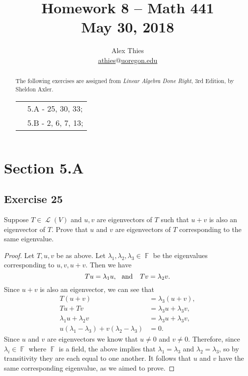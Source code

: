 \documentclass[letterpaper, 12pt]{amsart}
\DeclareMathOperator{\F}{\mathbb{F}}				%
\DeclareMathOperator{\Ell}{\mathscr{L}}				%
\theoremstyle{definition}  							%
\begin{document}
	\title{Homework 8  -- Math 441 \\ M\lowercase{ay 30, 2018}}
	\author{Alex Thies \\ \href{mailto:athies@uoregon.edu}{\lowercase{athies$@$uoregon.edu}}}

	\begin{abstract}
	The following exercises are assigned from \textit{Linear Algebra Done Right}, 3rd Edition, by Sheldon Axler. 
			\begin{tabular}{rl}
				& 5.A - 25, 30, 33; \\
				& 5.B - 2, 6, 7, 13;
			\end{tabular}
	\end{abstract}
	
	\maketitle

	\section*{Section 5.A}
		\subsection*{Exercise 25}
		Suppose $T \in \Ell(V)$ and $u,v$ are eigenvectors of $T$ such that $u + v$ is also an eigenvector of $T$. 
		Prove that $u$ and $v$ are eigenvectors of $T$ corresponding to the same eigenvalue.

		\begin{proof}
		Let $T,u,v$ be as above.
		Let $\lambda_{1},\lambda_{2},\lambda_{3} \in \F$ be the eigenvalues corresponding to $u,v,u+v$.
		Then we have $$Tu = \lambda_{1}u, \hspace{2.5mm} \text{and } \hspace{2.5mm} Tv = \lambda_{2}v.$$
		Since $u+v$ is also an eigenvector, we can see that
			\begin{align*}
				T(u+v) &= \lambda_{3}(u + v), \\
				Tu + Tv &= \lambda_{3}u + \lambda_{3}v, \\
				\lambda_{1}u + \lambda_{2}v &= \lambda_{3}u + \lambda_{3}v, \\
				u(\lambda_{1} - \lambda_{3}) + v(\lambda_{2} - \lambda_{3}) &= 0.
			\end{align*}
		Since $u$ and $v$ are eigenvectors we know that $u \neq 0$ and $v \neq 0$. 
		Therefore, since $\lambda_{i} \in \F$ where $\F$ is a field, the above implies that $\lambda_{1} = \lambda_{3}$ and $\lambda_{2} = \lambda_{3}$, so by transitivity they are each equal to one another.
		It follows that $u$ and $v$ have the same corresponding eigenvalue, as we aimed to prove.
		\end{proof}
		\pagebreak
\end{document}
